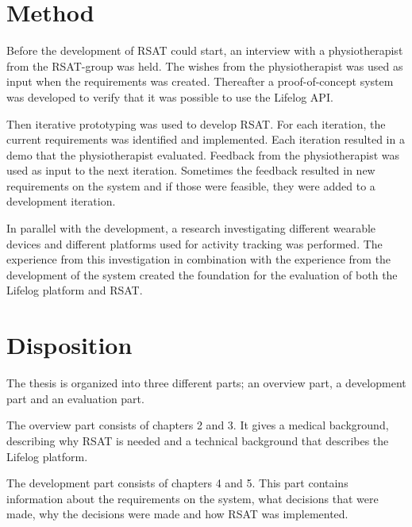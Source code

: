 \documentclass{cslthse-msc}
\begin{document}
\section{Method}%
Before the development of RSAT could start, an interview with a physiotherapist from the RSAT-group was held. The wishes from the physiotherapist was used as input when the requirements was created. Thereafter a proof-of-concept system was developed to verify that it was possible to use the Lifelog API.

Then iterative prototyping was used to develop RSAT. For each iteration, the current requirements was identified and implemented. Each iteration resulted in a demo that the physiotherapist evaluated. Feedback from the physiotherapist was used as input to the next iteration. Sometimes the feedback resulted in new requirements on the system and if those were feasible, they were added to a development iteration.  

In parallel with the development, a research investigating different wearable devices and different platforms used for activity tracking was performed. The experience from this investigation in combination with the experience from the development of the system created the foundation for the evaluation of both the Lifelog platform and RSAT.


\section{Disposition} %
The thesis is organized into three different parts; an overview part, a development part and an evaluation part. 

The overview part consists of chapters 2 and 3. It gives a medical background, describing why RSAT is needed and a technical background that describes the Lifelog platform. 


The development part consists of chapters 4 and 5. This part contains information about the requirements on the system, what decisions that were made, why the decisions were made and how RSAT was implemented.
\end{document}

